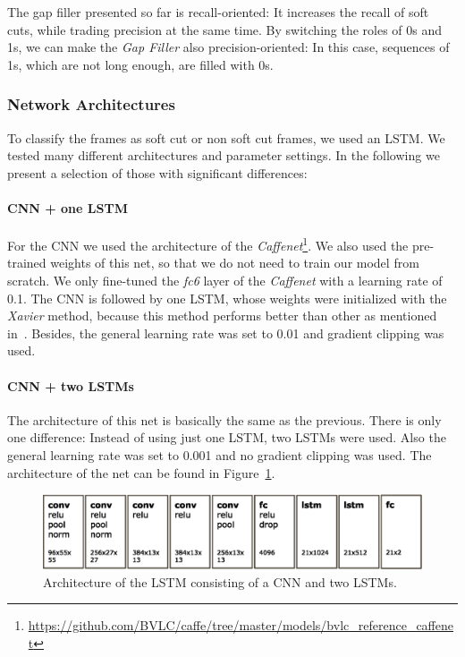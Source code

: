 The gap filler presented so far is recall-oriented: It increases the recall of soft cuts, while trading precision at the same time.
By switching the roles of 0s and 1s, we can make the \textit{Gap Filler} also precision-oriented:
In this case, sequences of 1s, which are not long enough, are filled with 0s.

\subsubsection{Network Architectures}
To classify the frames as soft cut or non soft cut frames, we used an LSTM.
We tested many different architectures and parameter settings.
In the following we present a selection of those with significant differences:

\paragraph{CNN + one LSTM}
For the CNN we used the architecture of the \textit{Caffenet}\footnote{\url{https://github.com/BVLC/caffe/tree/master/models/bvlc_reference_caffenet}}.
We also used the pre-trained weights of this net, so that we do not need to train our model from scratch.
We only fine-tuned the \textit{fc6} layer of the \textit{Caffenet} with a learning rate of 0.1.
The CNN is followed by one LSTM, whose weights were initialized with the \textit{Xavier} method, because this method performs better than other as mentioned in~\cite{glorot2010understanding}.
Besides, the general learning rate was set to 0.01 and gradient clipping was used.

\paragraph{CNN + two LSTMs}
The architecture of this net is basically the same as the previous.
There is only one difference: Instead of using just one LSTM, two LSTMs were used.
Also the general learning rate was set to 0.001 and no gradient clipping was used.
The architecture of the net can be found in Figure~\ref{fig:net_architecture}.
\begin{figure}[!htb]
	\centering
	\includegraphics[scale=.5]{images/net_architecture.eps}
	\caption{Architecture of the LSTM consisting of a CNN and two LSTMs.}
	\label{fig:net_architecture}
\end{figure}

